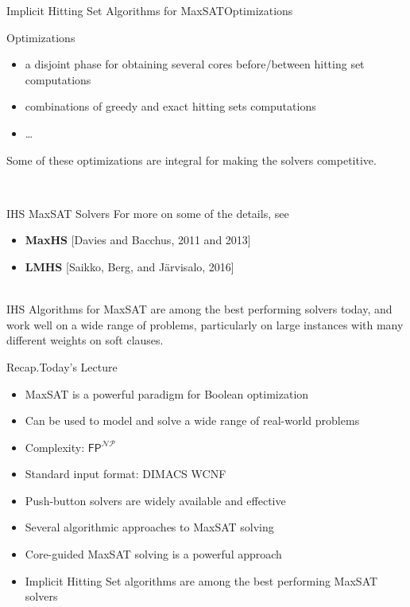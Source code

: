 \documentclass[t,english]{sdqbeamer}
\begin{document}
\begin{frame}{Implicit Hitting Set Algorithms for MaxSAT}{Optimizations}
\begin{block}{Optimizations}
\begin{itemize}
	\item a disjoint phase for obtaining several cores before/between hitting set computations
	\item combinations of greedy and exact hitting sets computations
	\item \dots
\end{itemize}
Some of these optimizations are integral for making the solvers competitive.\\
\end{block}~\\
\begin{block}{IHS MaxSAT Solvers}
For more on some of the details, see
\begin{itemize}
	 \item \textbf{MaxHS} [Davies and Bacchus, 2011 and 2013]
	 \item \textbf{LMHS} [Saikko, Berg, and Järvisalo, 2016]
\end{itemize}~\\
IHS Algorithms for MaxSAT are among the best performing solvers today, and work well on a wide range of problems, particularly on large instances with many different weights on soft clauses.
\end{block}
\end{frame}

\begin{frame}{Recap.}{Today's Lecture}
\begin{itemize}\itemsep1em
	\item MaxSAT is a powerful paradigm for Boolean optimization
	\item Can be used to model and solve a wide range of real-world problems
	\item Complexity: $\mathsf{FP}^{\mathcal{NP}}$
	\item Standard input format: DIMACS WCNF
	\item Push-button solvers are widely available and effective
	\item Several algorithmic approaches to MaxSAT solving
	\item Core-guided MaxSAT solving is a powerful approach
	\item Implicit Hitting Set algorithms are among the best performing MaxSAT solvers
\end{itemize}
\end{frame}
\end{document}
